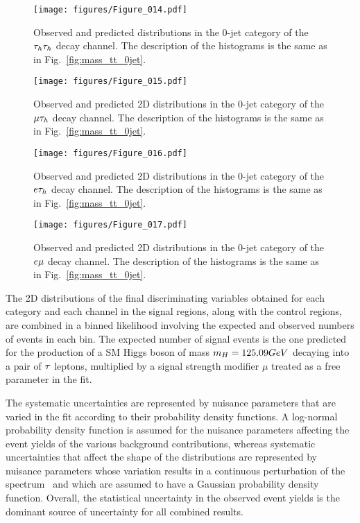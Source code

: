 \begin{figure*}[htbp]
\centering
     \texttt{[image: figures/Figure\_014.pdf]}
     \caption{Observed and predicted distributions in the 0-jet category of the $\tau_{h}\tau_{h}$ decay channel. The description of the histograms is the same as in Fig.~\ref{fig:mass_tt_0jet}.}
     \label{fig:mass_et_boosted}
\end{figure*}



\begin{figure*}[htbp]
\centering
     \texttt{[image: figures/Figure\_015.pdf]}
     \caption{Observed and predicted 2D distributions in the 0-jet category of the $\mu\tau_{h}$ decay channel. The description of the histograms is the same as in Fig.~\ref{fig:mass_tt_0jet}.}
     \label{fig:mass_em_0jet}
\end{figure*}

\begin{figure*}[htbp]
\centering
     \texttt{[image: figures/Figure\_016.pdf]}
     \caption{Observed and predicted 2D distributions in the 0-jet category of the $e\tau_{h}$ decay channel. The description of the histograms is the same as in Fig.~\ref{fig:mass_tt_0jet}.}
     \label{fig:mass_em_vbf}
\end{figure*}

\begin{figure*}[htbp]
\centering
     \texttt{[image: figures/Figure\_017.pdf]}
     \caption{Observed and predicted 2D distributions in the 0-jet category of the $e\mu$ decay channel. The description of the histograms is the same as in Fig.~\ref{fig:mass_tt_0jet}.}
     \label{fig:mass_em_boosted}
\end{figure*}


The 2D distributions of the final discriminating variables obtained for each category and each channel in the signal regions, along with the control regions, are combined in a binned likelihood involving the expected and observed numbers of events in each bin.
The expected number of signal events is the one predicted for the production of
a SM Higgs boson of mass $m_{H}=125.09GeV$ decaying into a pair of $\tau$ leptons,
multiplied by a signal strength modifier $\mu$ treated as a free parameter in the fit.

The systematic uncertainties are represented by nuisance parameters that are varied in the fit according to their probability density functions.
A log-normal probability density function is assumed for the nuisance parameters affecting the event yields of the various background contributions, whereas systematic uncertainties that affect the shape of the distributions are represented by nuisance parameters whose variation results in a continuous perturbation of the spectrum~\cite{Conway-PhyStat} and which are assumed to have a Gaussian probability density function.
Overall, the statistical uncertainty in the observed event yields is the dominant source of uncertainty for all combined results.

